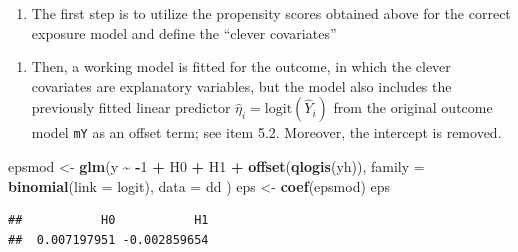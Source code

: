\documentclass[
]{book}
\newenvironment{Shaded}{\begin{snugshade}}{\end{snugshade}}
\newcommand{\AttributeTok}[1]{\textcolor[rgb]{0.13,0.29,0.53}{#1}}
\newcommand{\DecValTok}[1]{\textcolor[rgb]{0.00,0.00,0.81}{#1}}
\newcommand{\FunctionTok}[1]{\textcolor[rgb]{0.13,0.29,0.53}{\textbf{#1}}}
\newcommand{\NormalTok}[1]{#1}
\newcommand{\OtherTok}[1]{\textcolor[rgb]{0.56,0.35,0.01}{#1}}
\newcommand{\SpecialCharTok}[1]{\textcolor[rgb]{0.81,0.36,0.00}{\textbf{#1}}}
\providecommand{\tightlist}{%
  \setlength{\itemsep}{0pt}\setlength{\parskip}{0pt}}
\begin{document}
\begin{enumerate}
\def\labelenumi{\arabic{enumi}.}
\tightlist
\item
  The first step is to utilize the propensity scores
  obtained above for the correct exposure model
  and define the ``clever covariates''
\end{enumerate}

\begin{Shaded}
\end{Shaded}

\begin{enumerate}
\def\labelenumi{\arabic{enumi}.}
\setcounter{enumi}{1}
\tightlist
\item
  Then, a working model is fitted for the outcome,
  in which the clever
  covariates are explanatory variables, but the model
  also includes
  the previously fitted linear predictor
  \(\widehat{\eta}_i = \text{logit}(\widehat Y_i)\)
  from the original
  outcome model \texttt{mY} as an offset term; see item 5.2.
  Moreover, the intercept is removed.
\end{enumerate}

\begin{Shaded}
\begin{Highlighting}[]
\NormalTok{epsmod }\OtherTok{\textless{}{-}} \FunctionTok{glm}\NormalTok{(y }\SpecialCharTok{\textasciitilde{}} \SpecialCharTok{{-}}\DecValTok{1} \SpecialCharTok{+}\NormalTok{ H0 }\SpecialCharTok{+}\NormalTok{ H1 }\SpecialCharTok{+} \FunctionTok{offset}\NormalTok{(}\FunctionTok{qlogis}\NormalTok{(yh)),}
  \AttributeTok{family =} \FunctionTok{binomial}\NormalTok{(}\AttributeTok{link =}\NormalTok{ logit), }\AttributeTok{data =}\NormalTok{ dd}
\NormalTok{)}
\NormalTok{eps }\OtherTok{\textless{}{-}} \FunctionTok{coef}\NormalTok{(epsmod)}
\NormalTok{eps}
\end{Highlighting}
\end{Shaded}

\begin{verbatim}
##           H0           H1 
##  0.007197951 -0.002859654
\end{verbatim}
\end{document}
